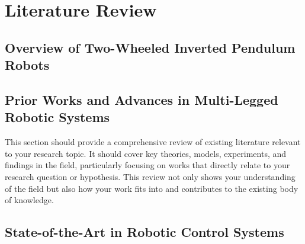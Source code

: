 \chapter{Literature Review}

\graphicspath{{./Figures/Modeling}}


\section{Overview of Two-Wheeled Inverted Pendulum Robots}
\section{Prior Works and Advances in Multi-Legged Robotic Systems}
This section should provide a comprehensive review of existing literature relevant to your research topic. It should cover key theories, models, experiments, and findings in the field, particularly focusing on works that directly relate to your research question or hypothesis. This review not only shows your understanding of the field but also how your work fits into and contributes to the existing body of knowledge.
\section{State-of-the-Art in Robotic Control Systems}

